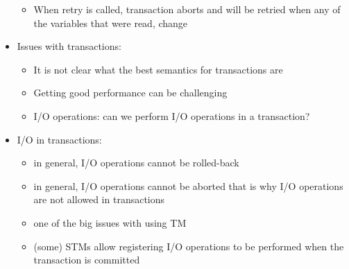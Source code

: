 \documentclass[a4paper]{article}
\begin{document}
\begin{itemize}
\begin{itemize}
\item When retry is called, transaction aborts and will be retried when any of the variables that were read, change
\end{itemize}
\item Issues with transactions:
\begin{itemize}
\item It is not clear what the best semantics for transactions are
\item Getting good performance can be challenging
\item I/O operations: can we perform I/O operations in a transaction?
\end{itemize}
\item I/O  in transactions: 
\begin{itemize}
\item in general, I/O operations cannot be rolled-back 
\item in general, I/O operations cannot be aborted that is why I/O operations are not allowed in transactions
\item one of the big issues with using TM
\item (some) STMs allow registering I/O operations to be performed when the transaction is committed
\end{itemize}
\end{itemize}
\end{document}
